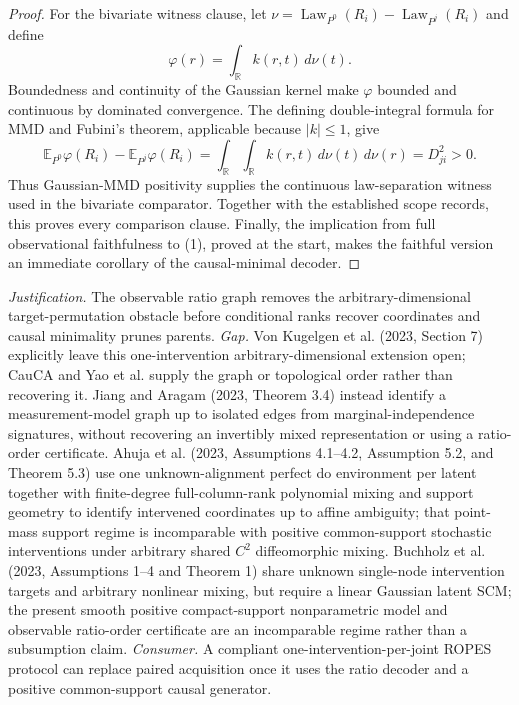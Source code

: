 \documentclass{article}
\begin{document}
\begin{proof}
For the bivariate witness clause, let \(\nu=\operatorname{Law}_{P^0}(R_i)-\operatorname{Law}_{P^j}(R_i)\) and define
\[
 \varphi(r)=\int_{\mathbb R}k(r,t)\,d\nu(t).
\tag{29}
\]
Boundedness and continuity of the Gaussian kernel make \(\varphi\) bounded and continuous by dominated convergence.  The defining double-integral formula for MMD and Fubini's theorem, applicable because \(|k|\le1\), give
\[
 \mathbb E_{P^0}\varphi(R_i)-\mathbb E_{P^j}\varphi(R_i)
 =\int_{\mathbb R}\!\int_{\mathbb R}k(r,t)\,d\nu(t)\,d\nu(r)
 =D_{ji}^{2}>0.
\tag{30}
\]
Thus Gaussian-MMD positivity supplies the continuous law-separation witness used in the bivariate comparator.  Together with the established scope records, this proves every comparison clause.  Finally, the implication from full observational faithfulness to (1), proved at the start, makes the faithful version an immediate corollary of the causal-minimal decoder.
\end{proof}
\par\smallskip\noindent \textit{Justification.} The observable ratio graph removes the arbitrary-dimensional target-permutation obstacle before conditional ranks recover coordinates and causal minimality prunes parents. \textit{Gap.} Von Kugelgen et al. (2023, Section 7) explicitly leave this one-intervention arbitrary-dimensional extension open; CauCA and Yao et al. supply the graph or topological order rather than recovering it. Jiang and Aragam (2023, Theorem 3.4) instead identify a measurement-model graph up to isolated edges from marginal-independence signatures, without recovering an invertibly mixed representation or using a ratio-order certificate. Ahuja et al. (2023, Assumptions 4.1--4.2, Assumption 5.2, and Theorem 5.3) use one unknown-alignment perfect do environment per latent together with finite-degree full-column-rank polynomial mixing and support geometry to identify intervened coordinates up to affine ambiguity; that point-mass support regime is incomparable with positive common-support stochastic interventions under arbitrary shared \(C^2\) diffeomorphic mixing. Buchholz et al. (2023, Assumptions 1--4 and Theorem 1) share unknown single-node intervention targets and arbitrary nonlinear mixing, but require a linear Gaussian latent SCM; the present smooth positive compact-support nonparametric model and observable ratio-order certificate are an incomparable regime rather than a subsumption claim. \textit{Consumer.} A compliant one-intervention-per-joint ROPES protocol can replace paired acquisition once it uses the ratio decoder and a positive common-support causal generator.
\end{document}
